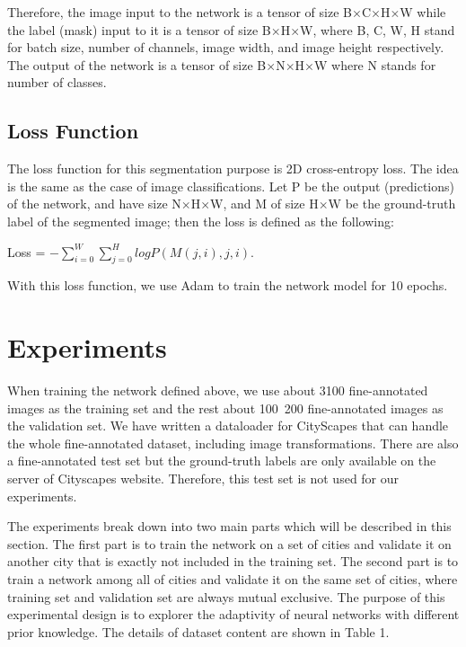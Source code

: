 \documentclass[10pt,twocolumn,letterpaper]{article}
\begin{document}
Therefore, the image input to the network is a tensor of size B$\times$C$\times$H$\times$W while the label (mask) input to it is a tensor of size B$\times$H$\times$W, where B, C, W, H stand for batch size, number of channels, image width, and image height respectively. The output of the network is a tensor of size B$\times$N$\times$H$\times$W where N stands for number of classes.

\subsection{Loss Function}
The loss function for this segmentation purpose is 2D cross-entropy loss. The idea is the same as the case of image classifications. Let P be the output (predictions) of the network, and have size N$\times$H$\times$W, and M of size H$\times$W be the ground-truth label of the segmented image; then the loss is defined as the following:
\begin{center}
	Loss = $-\sum_{i=0}^{W}\sum_{j=0}^{H}logP(M(j,i),j,i)$.
\end{center}
With this loss function, we use Adam to train the network model for 10 epochs.

\section{Experiments}
When training the network defined above, we use about 3100 fine-annotated images as the training set and the rest about 100~200 fine-annotated images as the validation set. We have written a dataloader for CityScapes that can handle the whole fine-annotated dataset, including image transformations. There are also a fine-annotated test set but the ground-truth labels are only available on the server of Cityscapes website. Therefore, this test set is not used for our experiments.

The experiments break down into two main parts which will be described in this section. The first part is to train the network on a set of cities and validate it on another city that is exactly not included in the training set. The second part is to train a network among all of cities and validate it on the same set of cities, where training set and validation set are always mutual exclusive. The purpose of this experimental design is to explorer the adaptivity of neural networks with different prior knowledge. The details of dataset content are shown in Table 1.
\end{document}
